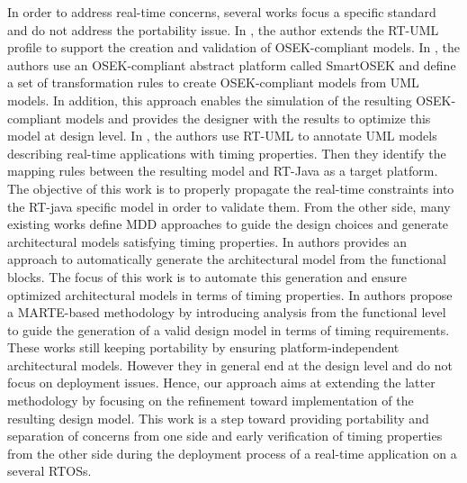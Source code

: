 \documentclass[runningheads,a4paper]{llncs}
\begin{document}
In order to address real-time concerns, several works focus a specific standard and do not address the portability issue. In \cite{artisan}, the author extends the RT-UML profile to support the creation and validation of OSEK-compliant models. In \cite{icess05}, the authors use an OSEK-compliant abstract platform called SmartOSEK \cite{oseksmart} and define a set of transformation rules to create OSEK-compliant models from UML models. In addition, this approach enables the simulation of the resulting OSEK-compliant models and provides the designer with the results to optimize this model at design level. In \cite{isorc02}, the authors use RT-UML to annotate UML models describing real-time applications with timing properties. Then they identify the mapping rules between the resulting model and RT-Java as a target platform. The objective of this work is to properly propagate the real-time constraints into the RT-java specific model in order to validate them. From the other side, many existing works define MDD approaches to guide the design choices and generate architectural models satisfying timing properties. In \cite{marco} authors provides an approach to automatically generate the architectural model from the functional blocks. The focus of this work is to automate this generation and ensure optimized architectural models in terms of timing properties. In \cite{optimum} authors propose a MARTE-based methodology by introducing analysis from the functional level to guide the generation of a valid design model in terms of timing requirements. These works still keeping portability by ensuring platform-independent architectural models. However they in general end at the design level and do not focus on deployment issues. Hence, our approach aims at extending the latter methodology \cite{optimum} by focusing on the refinement toward implementation of the resulting design model. This work is a step toward providing portability and separation of concerns from one side and early verification of timing properties from the other side during the deployment process of a real-time application on a several RTOSs. 
\end{document}
